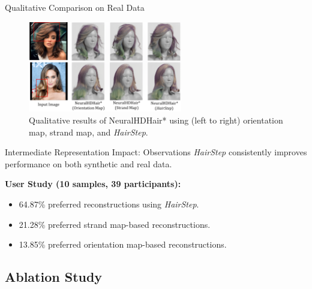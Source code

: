 \begin{frame}{Qualitative Comparison on Real Data}
    \begin{figure}
        \centering
        \includegraphics[width=0.6\textwidth]{assets/figures/eval/neuralhdhair.png}
        \caption{Qualitative results of NeuralHDHair* using (left to right) orientation map, strand map, and \emph{HairStep}.}
    \end{figure}
\end{frame}

\begin{frame}[t]{Intermediate Representation Impact: Observations}
    \emph{HairStep} consistently improves performance on both synthetic and real data.

    \vspace{5pt}
    \textbf{User Study (10 samples, 39 participants):}
    \begin{itemize}
        \item 64.87\% preferred reconstructions using \emph{HairStep}.
        \item 21.28\% preferred strand map-based reconstructions.
        \item 13.85\% preferred orientation map-based reconstructions.
    \end{itemize}
\end{frame}

\subsection{Ablation Study}

